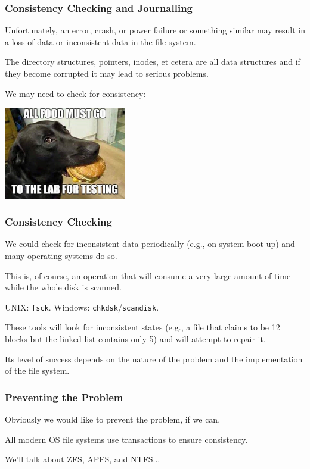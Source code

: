 \begin{frame}
	\frametitle{Consistency Checking and Journalling}

	Unfortunately, an error, crash, or power failure or something similar may result in a loss of data or inconsistent data in the file system.

	The directory structures, pointers, inodes, et cetera are all data structures and if they become corrupted it may lead to serious problems.

	We may need to check for consistency:

	\begin{center}
		\includegraphics[width=0.4\textwidth]{images/lab-testing.jpeg}
	\end{center}

\end{frame}

\begin{frame}
	\frametitle{Consistency Checking}

	We could check for inconsistent data periodically (e.g., on system boot up) and many operating systems do so.

	This is, of course, an operation that will consume a very large amount of time while the whole disk is scanned.

	UNIX: \texttt{fsck}. Windows: \texttt{chkdsk}/\texttt{scandisk}.

	These tools will look for inconsistent states (e.g., a file that claims to be 12 blocks but the linked list contains only 5) and will attempt to repair it.

	Its level of success depends on the nature of the problem and the implementation of the file system.

\end{frame}



\begin{frame}
	\frametitle{Preventing the Problem}

	Obviously we would like to prevent the problem, if we can.

	All modern OS file systems use transactions to ensure consistency.

	We'll talk about ZFS, APFS, and NTFS...

\end{frame}


